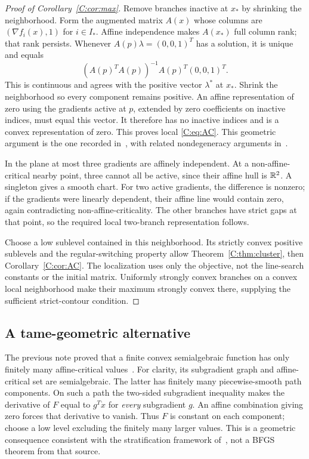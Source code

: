 \begin{proof}[Proof of Corollary~\ref{C:cor:max}]
Remove branches inactive at $x_*$ by shrinking the neighborhood. Form the augmented matrix $A(x)$ whose columns are $(\nabla f_i(x),1)$ for $i\in I_*$. Affine independence makes $A(x_*)$ full column rank; that rank persists. Whenever $A(p)\lambda=(0,0,1)^T$ has a solution, it is unique and equals
\[
 (A(p)^TA(p))^{-1}A(p)^T(0,0,1)^T.
\]
This is continuous and agrees with the positive vector $\lambda^*$ at $x_*$. Shrink the neighborhood so every component remains positive. An affine representation of zero using the gradients active at $p$, extended by zero coefficients on inactive indices, must equal this vector. It therefore has no inactive indices and is a convex representation of zero. This proves local \eqref{C:eq:AC}. This geometric argument is the one recorded in~\cite{SA}, with related nondegeneracy arguments in~\cite{BG}.

In the plane at most three gradients are affinely independent. At a non-affine-critical nearby point, three cannot all be active, since their affine hull is $\mathbb R^2$. A singleton gives a smooth chart. For two active gradients, the difference is nonzero; if the gradients were linearly dependent, their affine line would contain zero, again contradicting non-affine-criticality. The other branches have strict gaps at that point, so the required local two-branch representation follows.

Choose a low sublevel contained in this neighborhood. Its strictly convex positive sublevels and the regular-switching property allow Theorem~\ref{C:thm:cluster}, then Corollary~\ref{C:cor:AC}. The localization uses only the objective, not the line-search constants or the initial matrix. Uniformly strongly convex branches on a convex local neighborhood make their maximum strongly convex there, supplying the sufficient strict-contour condition.
\end{proof}

\subsection{A tame-geometric alternative}
The previous note proved that a finite convex semialgebraic function has only finitely many affine-critical values~\cite{SA}. For clarity, its subgradient graph and affine-critical set are semialgebraic. The latter has finitely many piecewise-smooth path components. On such a path the two-sided subgradient inequality makes the derivative of $F$ equal to $g^T\dot x$ for \emph{every} subgradient $g$. An affine combination giving zero forces that derivative to vanish. Thus $F$ is constant on each component; choose a low level excluding the finitely many larger values. This is a geometric consequence consistent with the stratification framework of~\cite{BDLS}, not a BFGS theorem from that source.

